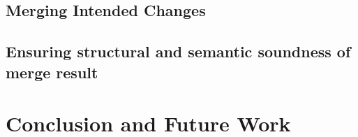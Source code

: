 \documentclass[a4paper,english]{ifimaster}
\begin{document}
\section{Merging Intended Changes}%
\label{sec:merging_intended_changes}

\section{Ensuring structural and semantic soundness of merge result}%
\label{sec:ensuring_structural_and_semantic_soundness_of_merge_result}

\chapter{Conclusion and Future Work}%
\label{cha:conclusion_and_future_work}

\backmatter{}

\printbibliography
\end{document}
